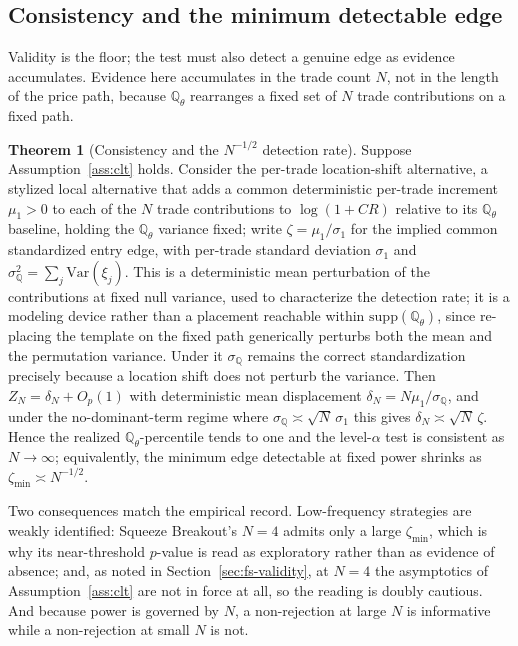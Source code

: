\documentclass[preprint,12pt]{elsarticle}
\theoremstyle{definition}
\newtheorem{theorem}{Theorem}
\begin{document}
\subsection{Consistency and the minimum detectable edge}
\label{sec:mde}

Validity is the floor; the test must also detect a genuine edge as evidence
accumulates. Evidence here accumulates in the trade count $N$, not in the length
of the price path, because $\mathbb{Q}_\theta$ rearranges a fixed set of $N$
trade contributions on a fixed path.

\begin{theorem}[Consistency and the $N^{-1/2}$ detection rate]
\label{prop:consistency}
Suppose Assumption~\ref{ass:clt} holds. Consider the per-trade location-shift
alternative, a stylized local alternative that adds a common deterministic
per-trade increment $\mu_1>0$ to each of the $N$ trade contributions to
$\log(1+CR)$ relative to its $\mathbb{Q}_\theta$ baseline, holding the
$\mathbb{Q}_\theta$ variance fixed; write $\zeta=\mu_1/\sigma_1$ for the implied
common standardized entry edge, with per-trade standard deviation $\sigma_1$ and
$\sigma_{\mathbb Q}^2=\sum_j\mathrm{Var}(\xi_j)$. This is a deterministic mean
perturbation of the contributions at fixed null variance, used to characterize
the detection rate; it is a modeling device rather than a placement reachable
within $\mathrm{supp}(\mathbb{Q}_\theta)$, since re-placing the template on the
fixed path generically perturbs both the mean and the permutation variance. Under
it $\sigma_{\mathbb Q}$ remains the correct standardization precisely because a
location shift does not perturb the variance. Then $Z_N=\delta_N+O_p(1)$ with
deterministic mean displacement $\delta_N=N\mu_1/\sigma_{\mathbb Q}$, and under the
no-dominant-term regime where $\sigma_{\mathbb Q}\asymp\sqrt N\,\sigma_1$ this
gives $\delta_N\asymp\sqrt N\,\zeta$. Hence the realized
$\mathbb{Q}_\theta$-percentile tends to one and the level-$\alpha$ test is
consistent as $N\to\infty$; equivalently, the minimum edge detectable at fixed
power shrinks as $\zeta_{\min}\asymp N^{-1/2}$.
\end{theorem}

Two consequences match the empirical record. Low-frequency strategies are weakly
identified: Squeeze Breakout's $N=4$ admits only a large $\zeta_{\min}$, which is
why its near-threshold $p$-value is read as exploratory rather than as evidence of
absence; and, as noted in Section~\ref{sec:fs-validity}, at $N=4$ the
asymptotics of Assumption~\ref{ass:clt} are not in force at all, so the reading
is doubly cautious. And because power is governed by $N$, a non-rejection at
large $N$ is informative while a non-rejection at small $N$ is not.
\end{document}
